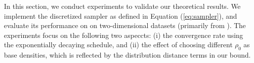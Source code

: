In this section, we conduct experiments to validate our theoretical results. We implement the discretized sampler as defined in Equation (\ref{eq:sampler}), and evaluate its performance on on two-dimensional datasets (primarily from \citealt{grathwohl2018scalable}). The experiments focus on the following two aspeccts: (i) the convergence rate using the exponentially decaying schedule, and (ii) the effect of choosing different $\rho_0$ as base densities, which is reflected by the distribution distance terms in our bound.



